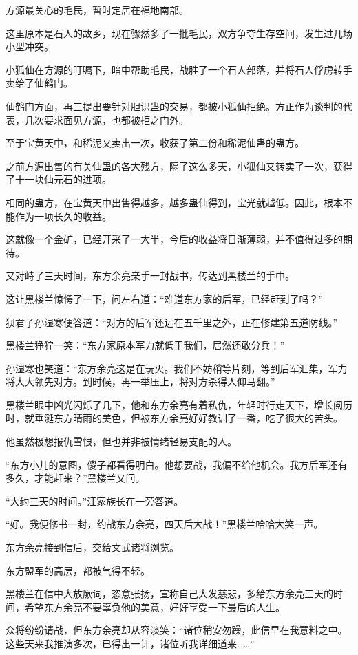 \begin{this_body}
方源最关心的毛民，暂时定居在福地南部。

这里原本是石人的故乡，现在骤然多了一批毛民，双方争夺生存空间，发生过几场小型冲突。

小狐仙在方源的叮嘱下，暗中帮助毛民，战胜了一个石人部落，并将石人俘虏转手卖给了仙鹤门。

仙鹤门方面，再三提出要针对胆识蛊的交易，都被小狐仙拒绝。方正作为谈判的代表，几次要求面见方源，也都被拒之门外。

至于宝黄天中，和稀泥又卖出一次，收获了第二份和稀泥仙蛊的蛊方。

之前方源出售的有关仙蛊的各大残方，隔了这么多天，小狐仙又转卖了一次，获得了十一块仙元石的进项。

相同的蛊方，在宝黄天中出售得越多，越多蛊仙得到，宝光就越低。因此，根本不能作为一项长久的收益。

这就像一个金矿，已经开采了一大半，今后的收益将日渐薄弱，并不值得过多的期待。

又对峙了三天时间，东方余亮亲手一封战书，传达到黑楼兰的手中。

这让黑楼兰惊愕了一下，问左右道：“难道东方家的后军，已经赶到了吗？”

狈君子孙湿寒便答道：“对方的后军还远在五千里之外，正在修建第五道防线。”

黑楼兰狰狞一笑：“东方家原本军力就低于我们，居然还敢分兵！”

孙湿寒也笑道：“东方余亮这是在玩火。我们不妨稍等片刻，等到后军汇集，军力将大大领先对方。到时候，再一举压上，将对方杀得人仰马翻。”

黑楼兰眼中凶光闪烁了几下，他和东方余亮有着私仇，年轻时行走天下，增长阅历时，就垂涎东方晴雨的美色，但被东方余亮好好教训了一番，吃了很大的苦头。

他虽然极想报仇雪恨，但也并非被情绪轻易支配的人。

“东方小儿的意图，傻子都看得明白。他想要战，我偏不给他机会。我方后军还有多久，才能赶来？”黑楼兰又问。

“大约三天的时间。”汪家族长在一旁答道。

“好。我便修书一封，约战东方余亮，四天后大战！”黑楼兰哈哈大笑一声。

东方余亮接到信后，交给文武诸将浏览。

东方盟军的高层，都被气得不轻。

黑楼兰在信中大放厥词，恣意张扬，宣称自己大发慈悲，多给东方余亮三天的时间，希望东方余亮不要辜负他的美意，好好享受一下最后的人生。

众将纷纷请战，但东方余亮却从容淡笑：“诸位稍安勿躁，此信早在我意料之中。这些天来我推演多次，已得出一计，诸位听我详细道来……”


\end{this_body}
